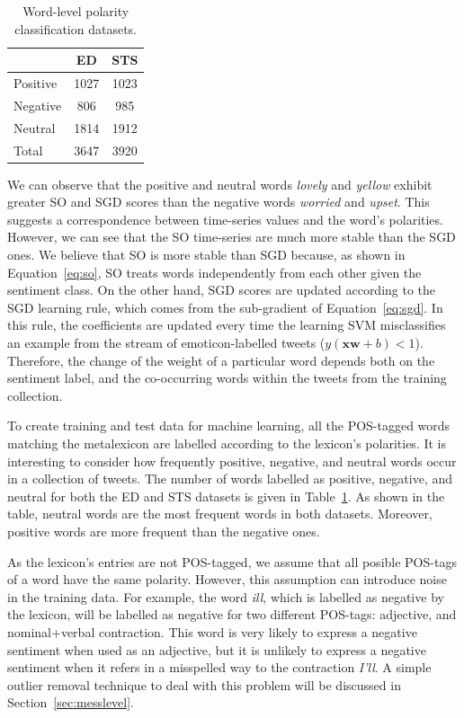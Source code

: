 \documentclass{sig-alternate}
\begin{document}
\begin{table}[htb]
\begin{center}
\begin{tabular}{l|c|c}
\hline
 & ED & STS \\ \hline
Positive & 1027 & 1023 \\ 
Negative & 806 & 985 \\ 
Neutral & 1814 & 1912 \\ 
Total & 3647 & 3920 \\ \hline
\end{tabular}
\end{center}
\caption{Word-level polarity classification datasets.}
\label{tab:wordcorpus}
\end{table}


We can observe that the positive and neutral words \emph{lovely} and \emph{yellow} exhibit greater SO and SGD scores than the negative words  \emph{worried} and \emph{upset}. This  suggests a correspondence between time-series values and the word's polarities. However, we can see that the SO time-series are much more stable than the SGD ones. We believe that SO is more stable than SGD because, as shown in Equation~\ref{eq:so}, SO treats words  independently from each other given the sentiment class. On the other hand, SGD scores are updated according to the SGD learning rule, which comes from the sub-gradient of Equation~\ref{eq:sgd}. In this rule, the coefficients are updated every time the learning SVM misclassifies an example from the stream of emoticon-labelled tweets ($y(\mathbf{xw} +b) <1$). Therefore, the change of the weight of a particular word depends both on the sentiment label, and the co-occurring words within the tweets from the training collection.  


To create training and test data for machine learning, all the POS-tagged words matching the metalexicon are labelled according to the lexicon's polarities. It is interesting to consider how frequently positive, negative, and neutral words occur in a collection of tweets. The number of words labelled as positive, negative, and neutral for both the ED and STS datasets is given in Table~\ref{tab:wordcorpus}. As shown in the table, neutral words are the most frequent words in both datasets. Moreover, positive words are more frequent than the negative ones. 



As the lexicon's entries are not POS-tagged, we assume that all posible POS-tags of a word have the same polarity. However, this assumption can introduce noise in the training data. For example, the word \emph{ill}, which is labelled as negative by the lexicon, will be labelled as negative for two different POS-tags: adjective, and nominal+verbal contraction. This word is very likely to express a negative sentiment when used as an adjective, but it is unlikely to express a negative sentiment when it refers in a misspelled way to the contraction \emph{I'll}. A simple outlier removal technique to deal with this problem will be discussed in Section~\ref{sec:messlevel}.
 
\end{document}

